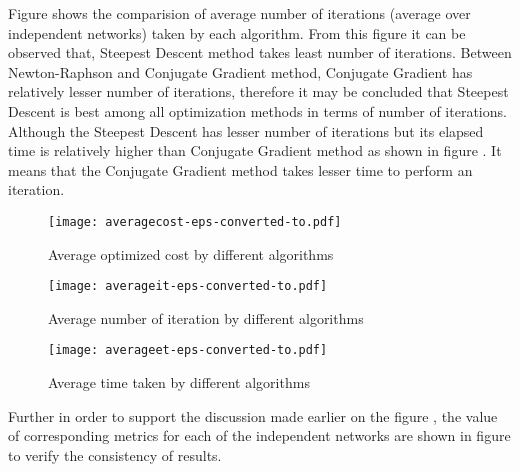 \documentclass[11pt]{article}
\numberwithin{equation}{section}
\begin{document}
Figure  shows the comparision of average number of iterations (average over  independent networks) taken by each algorithm. From this figure it can be observed that, Steepest Descent method takes least number of iterations. Between Newton-Raphson and Conjugate Gradient method, Conjugate Gradient has relatively lesser number of iterations, therefore it may be concluded that Steepest Descent is best among all optimization methods in terms of number of iterations.\\


Although the Steepest Descent has lesser number of iterations but its elapsed time is relatively higher than Conjugate Gradient method as shown in figure . It means that the Conjugate Gradient method takes lesser time to perform an iteration.\\

\begin{figure*}[htb!]
\begin{center}
\texttt{[image: averagecost-eps-converted-to.pdf]}
\end{center}
\caption{Average optimized cost by different algorithms}\label{f10}
\end{figure*}
\begin{figure*}[htb!]
\begin{center}
\texttt{[image: averageit-eps-converted-to.pdf]}
\end{center}
\caption{Average number of iteration by different algorithms}\label{f11}
\end{figure*}
\newpage
\begin{figure*}[htb!]
\begin{center}
\texttt{[image: averageet-eps-converted-to.pdf]}
\end{center}
\caption{Average time taken by different algorithms}\label{f12}
\end{figure*}
Further in order to support the discussion made earlier on the figure , the value of corresponding metrics for each of the  independent networks are shown in figure  to verify the consistency of results.\\
\end{document}
